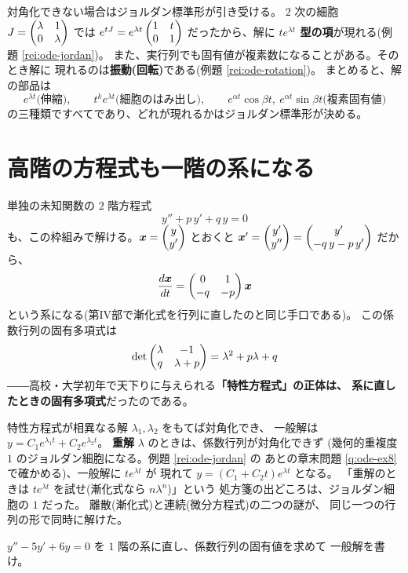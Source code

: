 対角化できない場合はジョルダン標準形が引き受ける。
$2$ 次の細胞 $J = \begin{pmatrix}\lambda & 1 \\ 0 & \lambda\end{pmatrix}$ では
$e^{tJ} = e^{\lambda t}\begin{pmatrix}1 & t \\ 0 & 1\end{pmatrix}$ だったから、解に
\textbf{$t e^{\lambda t}$ 型の項}が現れる(例題 \ref{rei:ode-jordan})。
また、実行列でも固有値が複素数になることがある。そのとき解に
現れるのは\textbf{振動(回転)}である(例題 \ref{rei:ode-rotation})。
まとめると、解の部品は
\[
e^{\lambda t} \text{(伸縮)}, \qquad
t^k e^{\lambda t} \text{(細胞のはみ出し)}, \qquad
e^{\alpha t}\cos\beta t,\ e^{\alpha t}\sin\beta t \text{(複素固有値)}
\]
の三種類ですべてであり、どれが現れるかはジョルダン標準形が決める。

\section{高階の方程式も一階の系になる}

単独の未知関数の $2$ 階方程式
\[
y'' + p\,y' + q\,y = 0
\]
も、この枠組みで解ける。$\bm{x} = \begin{pmatrix}y \\ y'\end{pmatrix}$ とおくと
$\bm{x}' = \begin{pmatrix}y' \\ y''\end{pmatrix} = \begin{pmatrix}y' \\ -q\,y - p\,y'\end{pmatrix}$ だから、
\[
\frac{d\bm{x}}{dt} = \begin{pmatrix}0 & 1 \\ -q & -p\end{pmatrix}\bm{x}
\]
という系になる(第IV部で漸化式を行列に直したのと同じ手口である)。
この係数行列の固有多項式は
\[
\det\begin{pmatrix}\lambda & -1 \\ q & \lambda + p\end{pmatrix} = \lambda^2 + p\lambda + q
\]
――高校・大学初年で天下りに与えられる\textbf{「特性方程式」の正体は、
系に直したときの固有多項式}だったのである。

特性方程式が相異なる解 $\lambda_1, \lambda_2$ をもてば対角化でき、
一般解は $y = C_1 e^{\lambda_1 t} + C_2 e^{\lambda_2 t}$。
\textbf{重解} $\lambda$ のときは、係数行列が対角化できず
(幾何的重複度 $1$ のジョルダン細胞になる。例題 \ref{rei:ode-jordan} の
あとの章末問題 \ref{q:ode-ex8} で確かめる)、一般解に $te^{\lambda t}$ が
現れて $y = (C_1 + C_2 t)e^{\lambda t}$ となる。
「重解のときは $te^{\lambda t}$ を試せ(漸化式なら $n\lambda^n$)」という
処方箋の出どころは、ジョルダン細胞の $1$ だった。
離散(漸化式)と連続(微分方程式)の二つの謎が、
同じ一つの行列の形で同時に解けた。

\begin{mondai}\label{q:ode-2nd}
$y'' - 5y' + 6y = 0$ を $1$ 階の系に直し、係数行列の固有値を求めて
一般解を書け。
\end{mondai}


